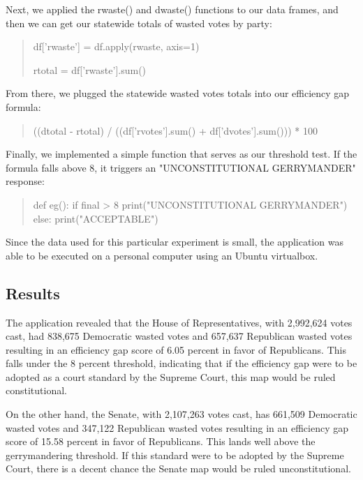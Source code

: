 \documentclass[sigconf]{acmart}
\begin{document}
Next, we applied the rwaste() and dwaste() functions to our data frames, and then we can get our statewide totals of wasted votes by party:

\begin{quote}
    df['rwaste'] = df.apply(rwaste, axis=1)
    
    rtotal = df['rwaste'].sum()
\end{quote}

From there, we plugged the statewide wasted votes totals into our efficiency gap formula:

\begin{quote}
((dtotal - rtotal) / ((df['rvotes'].sum() + df['dvotes'].sum())) * 100
\end{quote}

Finally, we implemented a simple function that serves as our threshold test. If the formula falls above 8, it triggers an "UNCONSTITUTIONAL GERRYMANDER" response:

\begin{quote}
    def eg():
    \indent if final > 8
    \indent \indent print("UNCONSTITUTIONAL GERRYMANDER")
    \indent else:
    \indent \indent print("ACCEPTABLE")
\end{quote}

Since the data used for this particular experiment is small, the application was able to be executed on a personal computer using an Ubuntu virtualbox. 

\subsection{Results}

The application revealed that the House of Representatives, with 2,992,624 votes cast, had 838,675 Democratic wasted votes and 657,637 Republican wasted votes resulting in an efficiency gap score of 6.05 percent in favor of Republicans. This falls under the 8 percent threshold, indicating that if the efficiency gap were to be adopted as a court standard by the Supreme Court, this map would be ruled constitutional.

On the other hand, the Senate, with 2,107,263 votes cast, has 661,509 Democratic wasted votes and 347,122 Republican wasted votes resulting in an efficiency gap score of 15.58 percent in favor of Republicans. This lands well above the gerrymandering threshold. If this standard were to be adopted by the Supreme Court, there is a decent chance the Senate map would be ruled unconstitutional. 
\end{document}
